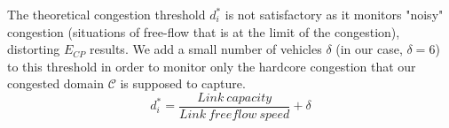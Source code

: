 The theoretical congestion threshold $d_{i}^{*}$ is not satisfactory as it monitors "noisy" congestion (situations of free-flow that is at the limit of the congestion), distorting $E_{CP}$ results. We add a small number of vehicles $\delta$ (in our case, $\delta=6$) to this threshold in order to monitor only the hardcore congestion that our congested domain $\mathscr{C}$ is supposed to capture.
			\begin{equation*} 
				d_{i}^{*}=\frac{Link\ capacity}{Link\ freeflow\ speed}+\delta
			\end{equation*}
			